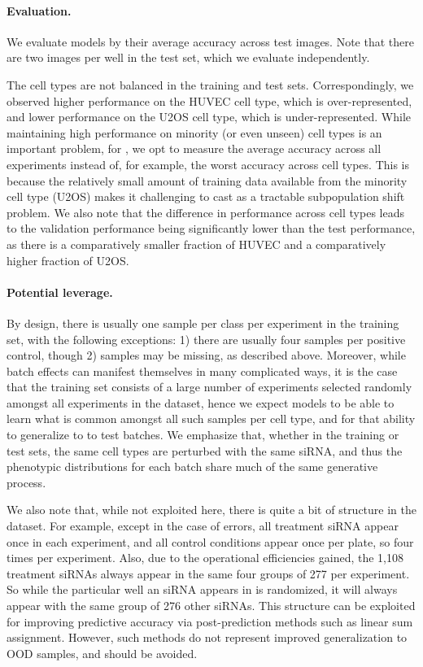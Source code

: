 \paragraph{Evaluation.}
We evaluate models by their average accuracy across test images. Note that there
are two images per well in the test set, which we evaluate independently.

The cell types are not balanced in the training and test sets.
Correspondingly, we observed higher performance on the HUVEC cell type, which is over-represented, and lower performance on the U2OS cell type, which is under-represented.
While maintaining high performance on minority (or even unseen) cell types is an important problem, for \RxRx, we opt to measure the average accuracy across all experiments instead of, for example, the worst accuracy across cell types.
This is because the relatively small amount of training data available from the minority cell type (U2OS) makes it challenging to cast \RxRx as a tractable subpopulation shift problem.
We also note that the difference in performance across cell types leads to the validation performance being significantly lower than the test performance, as there is a comparatively smaller fraction of HUVEC and a comparatively higher fraction of U2OS.

\paragraph{Potential leverage.}
By design, there is usually one sample per class per experiment in the training
set, with the following exceptions: 1) there are usually four samples per
positive control, though 2) samples may be missing, as described above.
Moreover, while batch effects can manifest themselves in many complicated ways,
it is the case that the training set consists of a large number of experiments
selected randomly amongst all experiments in the dataset, hence we
expect models to be able to learn what is common amongst all such samples per
cell type, and for that ability to generalize to to test batches. We emphasize
that, whether in the training or test sets, the same cell types are perturbed
with the same siRNA, and thus the phenotypic distributions for each batch share
much of the same generative process.

We also note that, while not exploited here, there is quite a bit of structure
in the \RxRx dataset. For example, except in the case of errors, all treatment
siRNA appear once in each experiment, and all control conditions appear once per
plate, so four times per experiment. Also, due to the operational efficiencies
gained, the 1,108 treatment siRNAs always appear in the same four groups of 277
per experiment.  So while the particular well an siRNA appears in is randomized,
it will always appear with the same group of 276 other siRNAs. This structure
can be exploited for improving predictive accuracy via post-prediction methods
such as linear sum assignment. However, such methods do not represent improved
generalization to OOD samples, and should be avoided.

